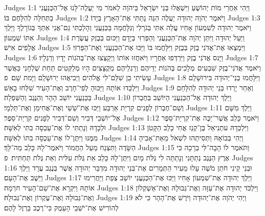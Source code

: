 Judges 1:1	וַיְהִי אַחֲרֵי מוֹת יְהוֹשֻׁעַ וַיִּשְׁאֲלוּ בְּנֵי יִשְׂרָאֵל בַּיהֹוָה לֵאמֹר מִי יַעֲלֶה־לָּנוּ אֶל־הַכְּנַעֲנִי בַּתְּחִלָּה לְהִלָּחֶם בּוֹ׃
Judges 1:2	וַיֹּאמֶר יְהֹוָה יְהוּדָה יַעֲלֶה הִנֵּה נָתַתִּי אֶת־הָאָרֶץ בְּיָדוֹ׃
Judges 1:3	וַיֹּאמֶר יְהוּדָה לְשִׁמְעוֹן אָחִיו עֲלֵה אִתִּי בְגֹרָלִי וְנִלָּחֲמָה בַּכְּנַעֲנִי וְהָלַכְתִּי גַם־אֲנִי אִתְּךָ בְּגוֹרָלֶךָ וַיֵּלֶךְ אִתּוֹ שִׁמְעוֹן׃
Judges 1:4	וַיַּעַל יְהוּדָה וַיִּתֵּן יְהֹוָה אֶת־הַכְּנַעֲנִי וְהַפְּרִזִּי בְּיָדָם וַיַּכּוּם בְּבֶזֶק עֲשֶׂרֶת אֲלָפִים אִישׁ׃
Judges 1:5	וַיִּמְצְאוּ אֶת־אֲדֹנִי בֶזֶק בְּבֶזֶק וַיִּלָּחֲמוּ בּוֹ וַיַּכּוּ אֶת־הַכְּנַעֲנִי וְאֶת־הַפְּרִזִּי׃
Judges 1:6	וַיָּנס אֲדֹנִי בֶזֶק וַיִּרְדְּפוּ אַחֲרָיו וַיֹּאחֲזוּ אוֹתוֹ וַיְקַצְּצוּ אֶת־בְּהֹנוֹת יָדָיו וְרַגְלָיו׃
Judges 1:7	וַיֹּאמֶר אֲדֹנִי־בֶזֶק שִׁבְעִים  מְלָכִים בְּהֹנוֹת יְדֵיהֶם וְרַגְלֵיהֶם מְקֻצָּצִים הָיוּ מְלַקְּטִים תַּחַת שֻׁלְחָנִי כַּאֲשֶׁר עָשִׂיתִי כֵּן שִׁלַּם־לִי אֱלֹהִים וַיְבִיאֻהוּ יְרוּשָׁלַ͏ִם וַיָּמת שָׁם׃ {פ}
Judges 1:8	וַיִּלָּחֲמוּ בְנֵי־יְהוּדָה בִּירוּשָׁלַ͏ִם וַיִּלְכְּדוּ אוֹתָהּ וַיַּכּוּהָ לְפִי־חָרֶב וְאֶת־הָעִיר שִׁלְּחוּ בָאֵשׁ׃
Judges 1:9	וְאַחַר יָרְדוּ בְּנֵי יְהוּדָה לְהִלָּחֵם בַּכְּנַעֲנִי יוֹשֵׁב הָהָר וְהַנֶּגֶב וְהַשְּׁפֵלָה׃
Judges 1:10	וַיֵּלֶךְ יְהוּדָה אֶל־הַכְּנַעֲנִי הַיּוֹשֵׁב בְּחֶבְרוֹן וְשֵׁם־חֶבְרוֹן לְפָנִים קִרְיַת אַרְבַּע וַיַּכּוּ אֶת־שֵׁשַׁי וְאֶת־אֲחִימַן וְאֶת־תַּלְמָי׃
Judges 1:11	וַיֵּלֶךְ מִשָּׁם אֶל־יוֹשְׁבֵי דְּבִיר וְשֵׁם־דְּבִיר לְפָנִים קִרְיַת־סֵפֶר׃
Judges 1:12	וַיֹּאמֶר כָּלֵב אֲשֶׁר־יַכֶּה אֶת־קִרְיַת־סֵפֶר וּלְכָדָהּ וְנָתַתִּי לוֹ אֶת־עַכְסָה בִתִּי לְאִשָּׁה׃
Judges 1:13	וַיִּלְכְּדָהּ עתְנִיאֵל בֶּן־קְנַז אֲחִי כָלֵב הַקָּטֹן מִמֶּנּוּ וַיִּתֶּן־לוֹ אֶת־עַכְסָה בִתּוֹ לְאִשָּׁה׃
Judges 1:14	וַיְהִי בְּבוֹאָהּ וַתְּסִיתֵהוּ לִשְׁאֹל מֵאֵת־אָבִיהָ הַשָּׂדֶה וַתִּצְנַח מֵעַל הַחֲמוֹר וַיֹּאמֶר־לָהּ כָּלֵב מַה־לָּךְ׃
Judges 1:15	וַתֹּאמֶר לוֹ הָבָה־לִּי בְרָכָה כִּי אֶרֶץ הַנֶּגֶב נְתַתָּנִי וְנָתַתָּה לִי גֻּלֹּת מָיִם וַיִּתֶּן־לָהּ כָּלֵב אֵת גֻּלֹּת עִלִּית וְאֵת גֻּלֹּת תַּחְתִּית׃ {פ}
Judges 1:16	וּבְנֵי קֵינִי חֹתֵן מֹשֶׁה עָלוּ מֵעִיר הַתְּמָרִים אֶת־בְּנֵי יְהוּדָה מִדְבַּר יְהוּדָה אֲשֶׁר בְּנֶגֶב עֲרָד וַיֵּלֶךְ וַיֵּשֶׁב אֶת־הָעָם׃
Judges 1:17	וַיֵּלֶךְ יְהוּדָה אֶת־שִׁמְעוֹן אָחִיו וַיַּכּוּ אֶת־הַכְּנַעֲנִי יוֹשֵׁב צְפַת וַיַּחֲרִימוּ אוֹתָהּ וַיִּקְרָא אֶת־שֵׁם־הָעִיר חרְמָה׃
Judges 1:18	וַיִּלְכֹּד יְהוּדָה אֶת־עַזָּה וְאֶת־גְּבוּלָהּ וְאֶת־אַשְׁקְלוֹן וְאֶת־גְּבוּלָהּ וְאֶת־עֶקְרוֹן וְאֶת־גְּבוּלָהּ׃
Judges 1:19	וַיְהִי יְהֹוָה אֶת־יְהוּדָה וַיֹּרֶשׁ אֶת־הָהָר כִּי לֹא לְהוֹרִישׁ אֶת־יֹשְׁבֵי הָעֵמֶק כִּי־רֶכֶב בַּרְזֶל לָהֶם׃
